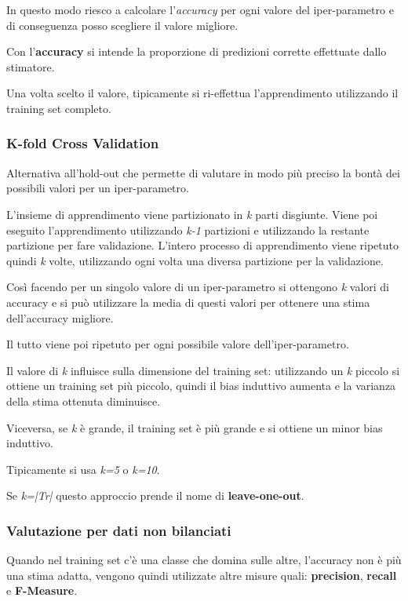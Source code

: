 In questo modo riesco a calcolare l'\emph{accuracy} per ogni valore del
iper-parametro e di conseguenza posso scegliere il valore migliore.

Con l'\textbf{accuracy} si intende la proporzione di predizioni corrette
effettuate dallo stimatore.

Una volta scelto il valore, tipicamente si ri-effettua l'apprendimento
utilizzando il training set completo.

\subsubsection{K-fold Cross Validation}\label{k-fold-cross-validation}

Alternativa all'hold-out che permette di valutare in modo più preciso la
bontà dei possibili valori per un iper-parametro.

L'insieme di apprendimento viene partizionato in \emph{k} parti
disgiunte. Viene poi eseguito l'apprendimento utilizzando \emph{k-1}
partizioni e utilizzando la restante partizione per fare validazione.
L'intero processo di apprendimento viene ripetuto quindi \emph{k} volte,
utilizzando ogni volta una diversa partizione per la validazione.

Così facendo per un singolo valore di un iper-parametro si ottengono
\emph{k} valori di accuracy e si può utilizzare la media di questi valori
per ottenere una stima dell'accuracy migliore.

Il tutto viene poi ripetuto per ogni possibile valore
dell'iper-parametro.

Il valore di \emph{k} influisce sulla dimensione del training set:
utilizzando un \emph{k} piccolo si ottiene un training set più piccolo,
quindi il bias induttivo aumenta e la varianza della stima ottenuta
diminuisce.

Viceversa, se \emph{k} è grande, il training set è più grande e si
ottiene un minor bias induttivo.

Tipicamente si usa \emph{k=5} o \emph{k=10}.

Se \textit{k=|Tr|} questo approccio prende il nome di \textbf{leave-one-out}.

\subsubsection{Valutazione per dati non bilanciati}\label{sec:pre-rec}

Quando nel training set c'è una classe che domina sulle altre,
l'accuracy non è più una stima adatta, vengono quindi utilizzate altre
misure quali: \textbf{precision}, \textbf{recall} e \textbf{F-Measure}.

